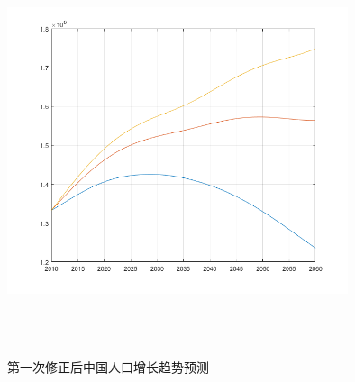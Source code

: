 \documentclass[a4paper]{article}
\begin{document}
	\begin{figure}[htbp]
		\centering
		\includegraphics[width=10cm]{pics/amend_1.png}
		\caption{第一次修正后中国人口增长趋势预测}
		\\
		\\
		\label{amend_1}	
	\end{figure}
\end{document}

